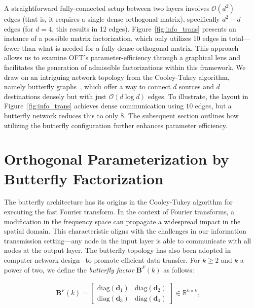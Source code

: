 A straightforward fully-connected setup between two layers involves $\mathcal{O}(d^2)$ edges (that is, it requires a single dense orthogonal matrix), specifically $d^2-d$ edges (for $d=4$, this results in 12 edges). Figure~\ref{fig:info_trans} presents an instance of a possible matrix factorization, which only utilizes $10$ edges in total—fewer than what is needed for a fully dense orthogonal matrix. This approach allows us to examine OFT’s parameter-efficiency through a graphical lens and facilitates the generation of admissible factorizations within this framework. We draw on an intriguing network topology from the Cooley-Tukey algorithm, namely butterfly graphs~\cite{cooley1965algorithm}, which offer a way to connect $d$ sources and $d$ destinations densely but with just $\mathcal{O}(d\log d)$ edges. To illustrate, the layout in Figure~\ref{fig:info_trans} achieves dense communication using $10$ edges, but a butterfly network reduces this to only $8$. The subsequent section outlines how utilizing the butterfly configuration further enhances parameter efficiency.

\section{Orthogonal Parameterization by Butterfly Factorization}

The butterfly architecture has its origins in the Cooley-Tukey algorithm for executing the fast Fourier transform. In the context of Fourier transforms, a modification in the frequency space can propagate a widespread impact in the spatial domain. This characteristic aligns with the challenges in our information transmission setting—any node in the input layer is able to communicate with all nodes at the output layer. The butterfly topology has also been adopted in computer network design~\cite{solihin2015fundamentals,li2011linear} to promote efficient data transfer. For $k \geq 2$ and $k$ a power of two, we define the \emph{butterfly factor} $\bm{B}^F(k)$ as follows:

\begin{equation}\label{eq:but_factor}
\begin{aligned}
    \bm{B}^F(k)=\begin{bmatrix}
    \text{diag}(\bm{d}_1) & \text{diag}(\bm{d}_2) \\
    \text{diag}(\bm{d}_3) & \text{diag}(\bm{d}_4)
    \end{bmatrix}\in\mathbb{R}^{k\times k},
\end{aligned}
\end{equation}

